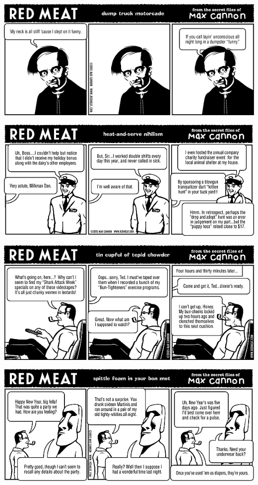 \documentclass[a4paper,twoside,11pt]{article}
\begin{document}
\includegraphics[width=\textwidth]{redmeat_2005-12-20.png}



\includegraphics[width=\textwidth]{redmeat_2005-12-27.png}



\includegraphics[width=\textwidth]{redmeat_2006-01-03.png}



\includegraphics[width=\textwidth]{redmeat_2006-01-10.png}
\end{document}
